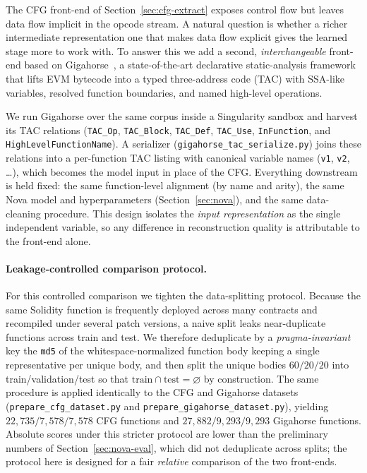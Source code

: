 \documentclass{article}
\begin{document}
The CFG front-end of Section~\ref{sec:cfg-extract} exposes control flow but leaves
data flow implicit in the opcode stream. A natural question is whether a richer
intermediate representation one that makes data flow explicit gives the learned
stage more to work with. To answer this we add a second, \emph{interchangeable}
front-end based on Gigahorse~\cite{grech2019gigahorse}, a state-of-the-art
declarative static-analysis framework that lifts EVM bytecode into a typed
three-address code (TAC) with SSA-like variables, resolved function boundaries, and
named high-level operations.

We run Gigahorse over the same corpus inside a Singularity sandbox and harvest its
TAC relations (\texttt{TAC\_Op}, \texttt{TAC\_Block}, \texttt{TAC\_Def},
\texttt{TAC\_Use}, \texttt{InFunction}, and \texttt{HighLevelFunctionName}). A
serializer (\texttt{gigahorse\_tac\_serialize.py}) joins these relations into a
per-function TAC listing with canonical variable names (\texttt{v1}, \texttt{v2},
\dots), which becomes the model input in place of the CFG. Everything downstream is
held fixed: the same function-level alignment (by name and arity), the same Nova
model and hyperparameters (Section~\ref{sec:nova}), and the same data-cleaning
procedure. This design isolates the \emph{input representation} as the single
independent variable, so any difference in reconstruction quality is attributable
to the front-end alone.

\paragraph{Leakage-controlled comparison protocol.}
For this controlled comparison we tighten the data-splitting protocol. Because the
same Solidity function is frequently deployed across many contracts and recompiled
under several patch versions, a naive split leaks near-duplicate functions across
train and test. We therefore deduplicate by a \emph{pragma-invariant} key the
\texttt{md5} of the whitespace-normalized function body keeping a single
representative per unique body, and then split the unique bodies $60/20/20$ into
train/validation/test so that $\text{train}\cap\text{test}=\varnothing$ by
construction. The same procedure is applied identically to the CFG and Gigahorse
datasets (\texttt{prepare\_cfg\_dataset.py} and
\texttt{prepare\_gigahorse\_dataset.py}), yielding $22{,}735/7{,}578/7{,}578$ CFG
functions and $27{,}882/9{,}293/9{,}293$ Gigahorse functions. Absolute scores under
this stricter protocol are lower than the preliminary numbers of
Section~\ref{sec:nova-eval}, which did not deduplicate across splits; the protocol
here is designed for a fair \emph{relative} comparison of the two front-ends.
\end{document}
